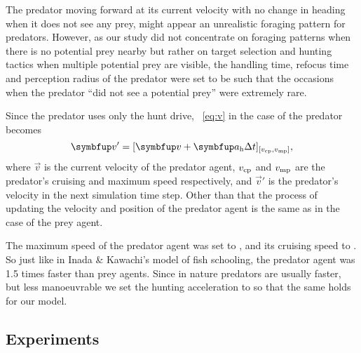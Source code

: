 The predator moving forward at its current velocity with no change in heading when it does not see any prey, might appear an unrealistic foraging pattern for predators. However, as our study did not concentrate on foraging patterns when there is no potential prey nearby but rather on target selection and hunting tactics when multiple potential prey are visible, the handling time, refocus time and perception radius of the predator were set to be such that the occasions when the predator ``did not see a potential prey'' were extremely rare.

Since the predator uses only the hunt drive, \eq~\eqref{eq:v} in the case of the predator becomes
%
\begin{equation}
\vec{v}'=[\vec{v}+\vec{a}_\textnormal{h}\Delta t]_{[v_\textnormal{cp},v_\textnormal{mp}]},
\end{equation}
%
where $\vec{v}$ is the current velocity of the predator agent, $v_\textnormal{cp}$ and $v_\textnormal{mp}$ are the predator's cruising and maximum speed respectively, and $\vec{v}'$ is the predator's velocity in the next simulation time step. Other than that the process of updating the velocity and position of the predator agent is the same as in the case of the prey agent.

The maximum speed of the predator agent was set to , and its cruising speed to . So just like in Inada \& Kawachi's \cite{inada2002order} model of fish schooling, the predator agent was \num{1.5} times faster than prey agents. Since in nature predators are usually faster, but less manoeuvrable \cite{domenici2001scaling} we set the hunting acceleration to  so that the same holds for our model.

\subsection{Experiments}


